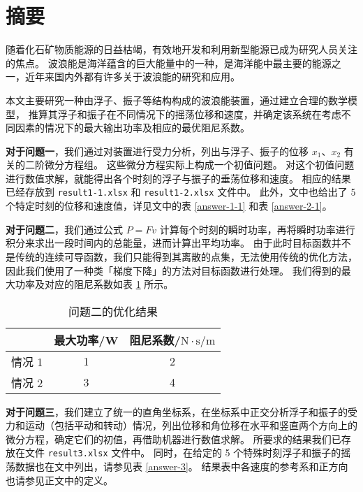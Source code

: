 \section*{摘要}
随着化石矿物质能源的日益枯竭，有效地开发和利用新型能源已成为研究人员关注的焦点。
波浪能是海洋蕴含的巨大能量中的一种，是海洋能中最主要的能源之一，近年来国内外都有许多关于波浪能的研究和应用。

本文主要研究一种由浮子、振子等结构构成的波浪能装置，通过建立合理的数学模型，
推算其浮子和振子在不同情况下的摇荡位移和速度，并确定该系统在考虑不同因素的情况下的最大输出功率及相应的最优阻尼系数。

\textbf{对于问题一}，我们通过对装置进行受力分析，列出与浮子、振子的位移 $x_1$、$x_2$ 有关的二阶微分方程组。
这些微分方程实际上构成一个初值问题。
对这个初值问题进行数值求解，就能得出各个时刻的浮子与振子的垂荡位移和速度。
相应的结果已经存放到 \verb|result1-1.xlsx| 和 \verb|result1-2.xlsx| 文件中。
此外，文中也给出了 5 个特定时刻的位移和速度值，详见文中的表 \ref{answer-1-1} 和表 \ref{answer-2-1}。

\textbf{对于问题二}，我们通过公式 $P=Fv$ 计算每个时刻的瞬时功率，再将瞬时功率进行积分来求出一段时间内的总能量，进而计算出平均功率。
由于此时目标函数并不是传统的连续可导函数，我们只能得到其离散的点集，无法使用传统的优化方法，因此我们使用了一种类「梯度下降」的方法对目标函数进行处理。
我们得到的最大功率及对应的阻尼系数如表 \ref{answer-2} 所示。
\begin{table}[htbp]
    \centering
    \begin{tabular}{ccc}
        \toprule
        & 最大功率/W & 阻尼系数/$\mathrm{N}\cdot\mathrm{s}/\mathrm{m}$ \\
        \midrule
        情况 1 & 1 & 2 \\
        情况 2 & 3 & 4 \\
        \bottomrule
    \end{tabular}
    \caption{问题二的优化结果}
    \label{answer-2}
\end{table}

\textbf{对于问题三}，我们建立了统一的直角坐标系，在坐标系中正交分析浮子和振子的受力和运动（包括平动和转动）情况，列出位移和角位移在水平和竖直两个方向上的微分方程，确定它们的初值，再借助机器进行数值求解。
所要求的结果我们已存放在文件 \verb|result3.xlsx| 文件中。
同时，在给定的 5 个特殊时刻浮子和振子的摇荡数据也在文中列出，请参见表 \ref{answer-3}。
结果表中各速度的参考系和正方向也请参见正文中的定义。

